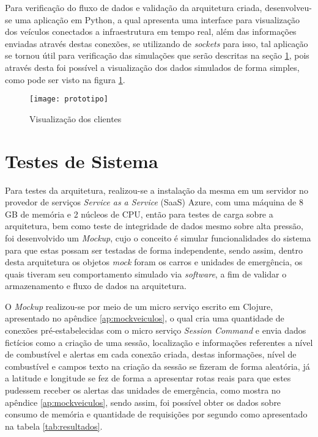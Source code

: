 Para verificação do fluxo de dados e validação da arquitetura criada, desenvolveu-se uma aplicação em Python, a qual apresenta uma interface para visualização dos veículos conectados a infraestrutura em tempo real, além das informações enviadas através destas conexões, se utilizando de \textit{sockets} para isso, tal aplicação se tornou útil para verificação das simulações que serão descritas na seção \ref{sec:testessistema}, pois através desta foi possível a visualização dos dados simulados de forma simples, como pode ser visto na figura \ref{fig:prototipo}.

\begin{figure}[!h]
\caption{\label{fig:prototipo} Visualização dos clientes}
\begin{center}
\texttt{[image: prototipo]}
\end{center}
\end{figure}

\section{Testes de Sistema}
\label{sec:testessistema}
Para testes da arquitetura, realizou-se a instalação da mesma em um servidor no provedor de serviços \textit{Service as a Service} (SaaS) Azure, com uma máquina de 8 GB de memória e 2 núcleos de CPU, então para testes de carga sobre a arquitetura, bem como teste de integridade de dados mesmo sobre alta pressão, foi desenvolvido um \textit{Mockup}, cujo o conceito é simular funcionalidades do sistema para que estas possam ser testadas de forma independente, sendo assim, dentro desta arquitetura os objetos \textit{mock} foram os carros e unidades de emergência, os quais tiveram seu comportamento simulado via \textit{software}, a fim de validar o armazenamento e fluxo de dados na arquitetura.

O \textit{Mockup} realizou-se por meio de um micro serviço escrito em Clojure, apresentado no apêndice \ref{ap:mockveiculos}, o qual cria uma quantidade de conexões pré-estabelecidas com o micro serviço \textit{Session Command} e envia dados fictícios como a criação de uma sessão, localização e informações referentes a nível de combustível e alertas em cada conexão criada, destas informações, nível de combustível e campos texto na criação da sessão se fizeram de forma aleatória, já a latitude e longitude se fez de forma a apresentar rotas reais para que estes pudessem receber os alertas das unidades de emergência, como mostra no apêndice \ref{ap:mockveiculos}, sendo assim, foi possível obter os dados sobre consumo de memória e quantidade de requisições por segundo como apresentado na tabela \ref{tab:resultados}.

